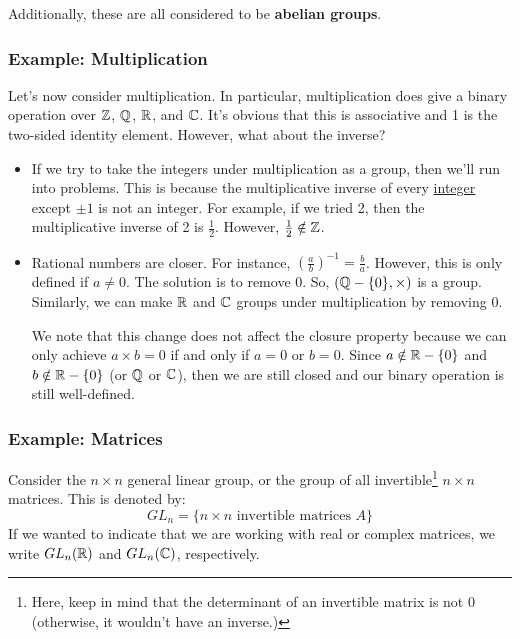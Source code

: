 \documentclass[letterpaper]{article}
\begin{document}
\bigskip 

Additionally, these are all considered to be \textbf{abelian groups}. 

\subsubsection{Example: Multiplication}
Let's now consider multiplication. In particular, multiplication does give a binary operation over $\mathbb{Z}$, $\mathbb{Q}$, $\mathbb{R}$, and $\mathbb{C}$. It's obvious that this is associative and 1 is the two-sided identity element. However, what about the inverse? 
\begin{itemize}
    \item If we try to take the integers under multiplication as a group, then we'll run into problems. This is because the multiplicative inverse of every \underline{integer} except $\pm 1$ is not an integer. For example, if we tried 2, then the multiplicative inverse of 2 is $\frac{1}{2}$. However, $\frac{1}{2} \notin \mathbb{Z}$.
    
    \item Rational numbers are closer. For instance, $\left(\frac{a}{b}\right)^{-1} = \frac{b}{a}$. However, this is only defined if $a \neq 0$. The solution is to remove 0. So, $(\mathbb{Q} - \{0\}, \times)$ is a group. Similarly, we can make $\mathbb{R}$ and $\mathbb{C}$ groups under multiplication by removing 0. 
    
    \bigskip 

    We note that this change does not affect the closure property because we can only achieve $a \times b = 0$ if and only if $a = 0$ or $b = 0$. Since $a \notin \mathbb{R} - \{0\}$ and $b \notin \mathbb{R} - \{0\}$ (or $\mathbb{Q}$ or $\mathbb{C}$), then we are still closed and our binary operation is still well-defined. 
\end{itemize}

\subsubsection{Example: Matrices}
Consider the $n \times n$ general linear group, or the group of all invertible\footnote{Here, keep in mind that the determinant of an invertible matrix is not 0 (otherwise, it wouldn't have an inverse.)} $n \times n$ matrices. This is denoted by: 
\[GL_n = \{n \times n \text{ invertible matrices } A\}\]
If we wanted to indicate that we are working with real or complex matrices, we write $GL_{n}(\mathbb{R})$ and $GL_{n}(\mathbb{C})$, respectively.
\end{document}
